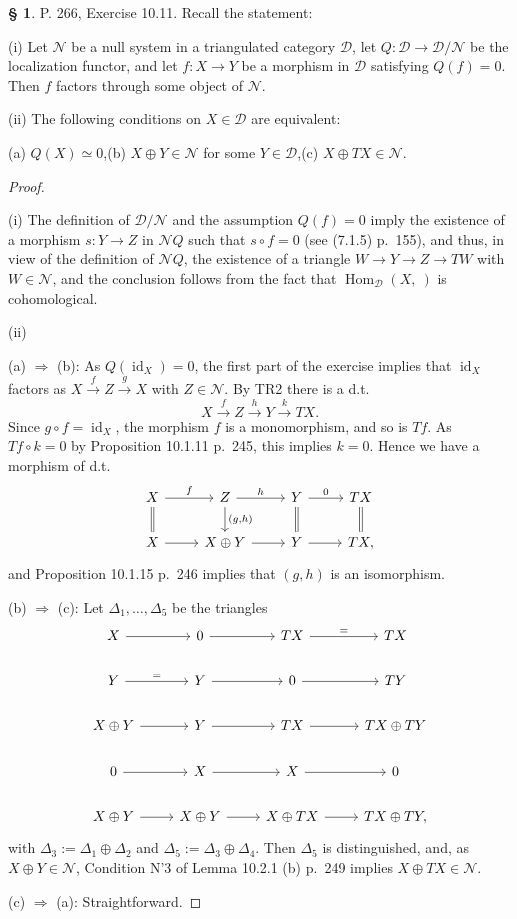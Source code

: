 \documentclass[12pt]{article}%
\theoremstyle{remark}
\theoremstyle{definition}
\newtheorem{s}[thm]{\S}%
\newcommand{\cc}{\mathcal}
\newcommand{\then}{\Rightarrow}
\newcommand{\xr}{\xrightarrow}
\DeclareMathOperator{\id}{id}
\DeclareMathOperator{\Hom}{Hom}%
\begin{document}
\begin{s} P. 266, Exercise 10.11. Recall the statement: 

\noindent(i) Let $\cc N$ be a null system in a triangulated category $\cc D$, let $Q:\cc D\to\cc D/\cc N$ be the localization functor, and let $f:X\to Y$ be a morphism in $\cc D$ satisfying $Q(f)=0$. Then $f$ factors through some object of $\cc N$. 

\noindent(ii) The following conditions on $X\in\cc D$ are equivalent: 

\noindent(a) $Q(X)\simeq0$,\quad(b) $X\oplus Y\in\cc N$ for some $Y\in\cc D$,\quad(c) $X\oplus TX\in\cc N$.

\begin{proof}\ 

\noindent(i) The definition of $\cc D/\cc N$ and the assumption $Q(f)=0$ imply the existence of a morphism $s:Y\to Z$ in $\cc NQ$ such that $s\circ f=0$ (see (7.1.5) p.~155), and thus, in view of the definition of $\cc NQ$, the existence of a triangle $W\to Y\to Z\to TW$ with $W\in\cc N$, and the conclusion follows from the fact that $\Hom_{\cc D}(X,\ )$ is cohomological. 

\noindent(ii)

\noindent(a) $\then$ (b): As $Q(\id_X)=0$, the first part of the exercise implies that $\id_X$ factors as $X\xr fZ\xr g X$ with $Z\in\cc N$. By TR2 there is a d.t. 
$$
X\xr fZ\xr hY\xr kTX.
$$ 
Since $g\circ f=\id_X$, the morphism $f$ is a monomorphism, and so is $Tf$. As $Tf\circ k=0$ by Proposition 10.1.11 p.~245, this implies $k=0$. Hence we have a morphism of d.t. 
$$
\begin{tikzcd}
X\ar[equal]{d}\ar{r}{f}&Z\ar{d}{(g,h)}\ar{r}{h}&Y\ar[equal]{d}\ar{r}{0}&TX\ar[equal]{d}\\ 
X\ar{r}&X\oplus Y\ar{r}&Y\ar{r}&TX,
\end{tikzcd}
$$
and Proposition 10.1.15 p.~246 implies that $(g,h)$ is an isomorphism.\bigskip 

\noindent(b) $\then$ (c): Let $\Delta_1,\dots,\Delta_5$ be the triangles
$$
\begin{tikzcd}
X\ar{r}&0\ar{r}&TX\ar{r}{=}&TX\\ 
Y\ar{r}{=}&Y\ar{r}&0\ar{r}&TY\\ 
X\oplus Y\ar{r}&Y\ar{r}&TX\ar{r}&TX\oplus TY\\ 
0\ar{r}&X\ar{r}&X\ar{r}&0\\ 
X\oplus Y\ar{r}&X\oplus Y\ar{r}&X\oplus TX\ar{r}&TX\oplus TY,
\end{tikzcd}
$$ 
with $\Delta_3:=\Delta_1\oplus\Delta_2$ and $\Delta_5:=\Delta_3\oplus\Delta_4$. Then $\Delta_5$ is distinguished, and, as $X\oplus Y\in\cc N$, Condition N'3 of Lemma 10.2.1 (b) p.~249 implies $X\oplus TX\in\cc N$.

\noindent(c) $\then$ (a): Straightforward.
\end{proof}
\end{s}
\end{document}
